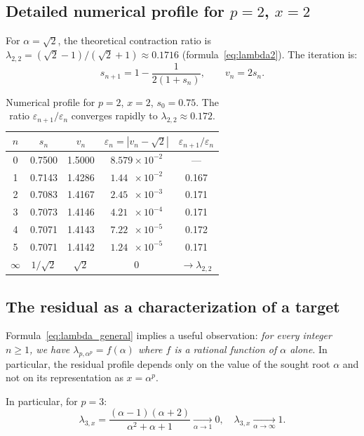 \documentclass[10pt,a4paper,oneside]{book}
\theoremstyle{definition}
\theoremstyle{remark}
\newcommand{\eps}{\varepsilon}
\begin{document}
\subsection{Detailed numerical profile for \texorpdfstring{$p=2$, $x=2$}{p=2, x=2}}

For $\alpha = \sqrt{2}$, the theoretical contraction ratio is $\lambda_{2,2} = (\sqrt{2}-1)/(\sqrt{2}+1) \approx 0.1716$ (formula~\eqref{eq:lambda2}). The iteration is:
\[
  s_{n+1} = 1 - \frac{1}{2(1 + s_n)}, \qquad v_n = 2s_n.
\]

\begin{table}[h]
\centering
\begin{tabular}{ccccc}
\toprule
$n$ & $s_n$ & $v_n$ & $\eps_n = |v_n - \sqrt{2}|$ & $\eps_{n+1}/\eps_n$ \\
\midrule
0 & 0.7500 & 1.5000 & $8.579\times 10^{-2}$ & --- \\
1 & 0.7143 & 1.4286 & $1.44\phantom{0}\times 10^{-2}$ & 0.167 \\
2 & 0.7083 & 1.4167 & $2.45\phantom{0}\times 10^{-3}$ & 0.171 \\
3 & 0.7073 & 1.4146 & $4.21\phantom{0}\times 10^{-4}$ & 0.171 \\
4 & 0.7071 & 1.4143 & $7.22\phantom{0}\times 10^{-5}$ & 0.172 \\
5 & 0.7071 & 1.4142 & $1.24\phantom{0}\times 10^{-5}$ & 0.171 \\
$\infty$ & $1/\sqrt{2}$ & $\sqrt{2}$ & $0$ & $\to \lambda_{2,2}$ \\
\bottomrule
\end{tabular}
\caption{Numerical profile for $p=2$, $x=2$, $s_0 = 0.75$. The ratio $\eps_{n+1}/\eps_n$ converges rapidly to $\lambda_{2,2} \approx 0.172$.}
\end{table}

\subsection{The residual as a characterization of a target}

Formula~\eqref{eq:lambda_general} implies a useful observation: \textit{for every integer $n \geq 1$, we have $\lambda_{p, \alpha^p} = f(\alpha)$ where $f$ is a rational function of $\alpha$ alone}.  In particular, the residual profile depends only on the value of the sought root $\alpha$ and not on its representation as $x=\alpha^p$.

In particular, for $p = 3$:
\[
  \lambda_{3,x} = \frac{(\alpha-1)(\alpha+2)}{\alpha^2+\alpha+1} \xrightarrow[\alpha \to 1]{} 0, \quad
  \lambda_{3,x} \xrightarrow[\alpha \to \infty]{} 1.
\]
\end{document}
